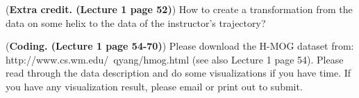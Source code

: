 \documentclass[12pt,letterpaper]{hmcpset}
\begin{document}
\begin{problem}[4]
	(\textbf{Extra credit. (Lecture 1 page 52)}) How to create a transformation from the data on some helix to the data of the instructor’s trajectory?
	
	
\end{problem}
\begin{solution}
	\vfill
\end{solution}
\newpage


\begin{problem}[5]
	(\textbf{Coding. (Lecture 1 page 54-70)}) Please download the H-MOG dataset from: http://www.cs.wm.edu/~qyang/hmog.html (see also Lecture 1 page 54).
	 Please read through the data description and do some visualizations if you have time. If you have any visualization result, please email or print out to submit.
	
	
\end{problem}
\begin{solution}
	\vfill
\end{solution}
\newpage
\end{document}
